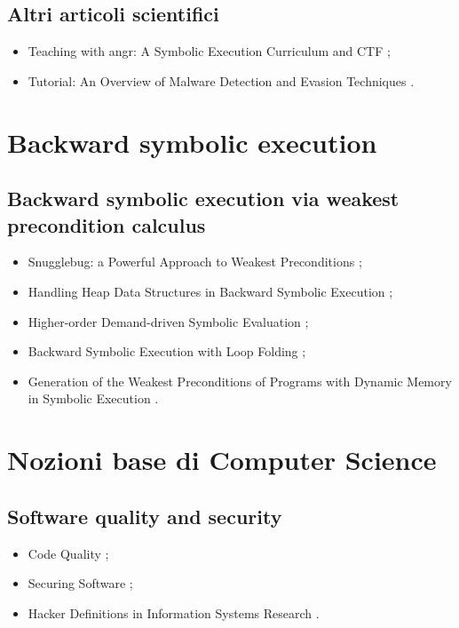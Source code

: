 \subsection*{Altri articoli scientifici}
\begin{itemize}

\item Teaching with angr: A Symbolic Execution Curriculum and CTF \cite{springer2018teaching};

\item Tutorial: An Overview of Malware Detection and Evasion Techniques \cite{biondi2018tutorial}.

\end{itemize}

\section*{Backward symbolic execution}

\subsection*{Backward symbolic execution via weakest precondition calculus}
\begin{itemize}

\item Snugglebug: a Powerful Approach to Weakest Preconditions \cite{chandra2009bsewpc};

\item Handling Heap Data Structures in Backward Symbolic Execution \cite{husak2020bsewpc};

\item Higher-order Demand-driven Symbolic Evaluation \cite{zachary2020bsewpc};

\item Backward Symbolic Execution with Loop Folding \cite{chalupa2021bsewpc};

\item Generation of the Weakest Preconditions of Programs with Dynamic Memory in Symbolic Execution \cite{misonizhnik2022bsewpc}.

\end{itemize}

\section*{Nozioni base di Computer Science}

\subsection*{Software quality and security}
\begin{itemize}

\item Code Quality \cite{bettini2021tdd15};

\item Securing Software \cite{mitropoulos2017securing};

\item Hacker Definitions in Information Systems Research \cite{oliver2020hacker}.

\end{itemize}